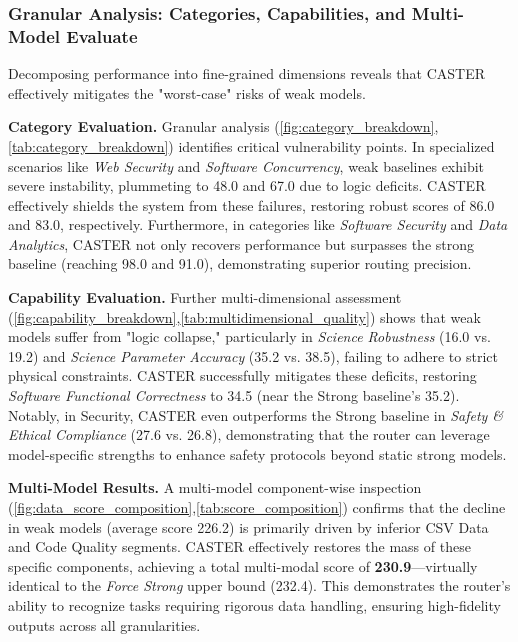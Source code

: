 \documentclass{article}
\theoremstyle{plain}
\theoremstyle{definition}
\theoremstyle{remark}
\begin{document}
\subsubsection{Granular Analysis: Categories, Capabilities, and Multi-Model Evaluate} Decomposing performance into fine-grained dimensions reveals that CASTER effectively mitigates the "worst-case" risks of weak models.

\textbf{Category Evaluation.} Granular analysis (\cref{fig:category_breakdown}, \cref{tab:category_breakdown}) identifies critical vulnerability points. In specialized scenarios like \textit{Web Security} and \textit{Software Concurrency}, weak baselines exhibit severe instability, plummeting to 48.0 and 67.0 due to logic deficits. CASTER effectively shields the system from these failures, restoring robust scores of 86.0 and 83.0, respectively. Furthermore, in categories like \textit{Software Security} and \textit{Data Analytics}, CASTER not only recovers performance but surpasses the strong baseline (reaching 98.0 and 91.0), demonstrating superior routing precision.

\textbf{Capability Evaluation.} Further multi-dimensional assessment (\cref{fig:capability_breakdown},\cref{tab:multidimensional_quality}) shows that weak models suffer from "logic collapse," particularly in \textit{Science Robustness} (16.0 vs. 19.2) and \textit{Science Parameter Accuracy} (35.2 vs. 38.5), failing to adhere to strict physical constraints. CASTER successfully mitigates these deficits, restoring \textit{Software Functional Correctness} to 34.5 (near the Strong baseline's 35.2). Notably, in Security, CASTER even outperforms the Strong baseline in \textit{Safety \& Ethical Compliance} (27.6 vs. 26.8), demonstrating that the router can leverage model-specific strengths to enhance safety protocols beyond static strong models.

\textbf{Multi-Model Results.} A multi-model component-wise inspection (\cref{fig:data_score_composition},\cref{tab:score_composition}) confirms that the decline in weak models (average score 226.2) is primarily driven by inferior CSV Data and Code Quality segments. CASTER effectively restores the mass of these specific components, achieving a total multi-modal score of \textbf{230.9}—virtually identical to the \textit{Force Strong} upper bound (232.4). This demonstrates the router's ability to recognize tasks requiring rigorous data handling, ensuring high-fidelity outputs across all granularities.
\end{document}
